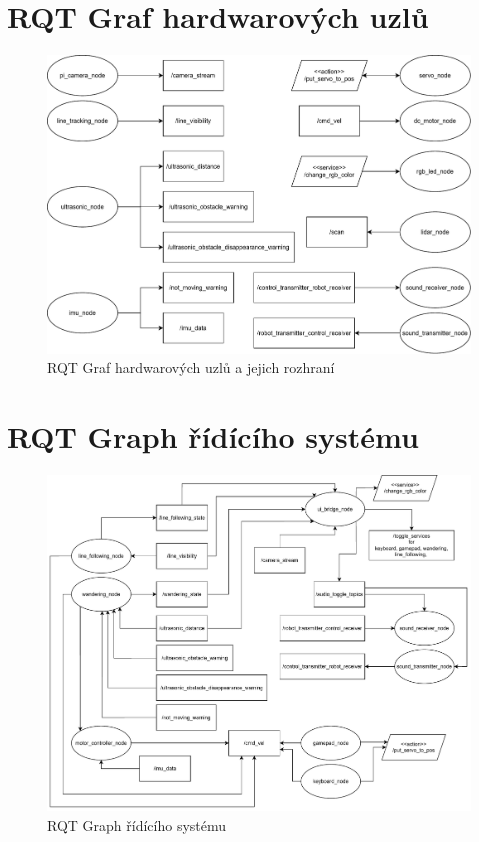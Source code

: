 
%

\chapter{RQT Graf hardwarových uzlů}

\begin{figure}[h!]
	\centering
	\includegraphics[scale=0.65]{obrazky-figures/hardware_nodes.pdf}
	\caption{RQT Graf hardwarových uzlů a jejich rozhraní}
	\label{}
\end{figure}

\chapter{RQT Graph řídícího systému}

\begin{figure}[h!]
	\centering
	\includegraphics[scale=0.55]{obrazky-figures/controller_nodes.pdf}
	\caption{RQT Graph řídícího systému}
	\label{}
\end{figure}

